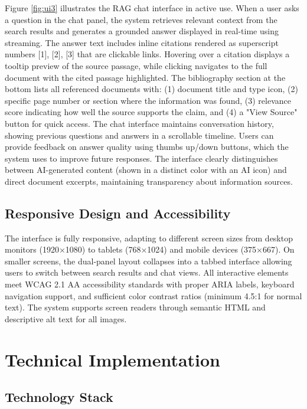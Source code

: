 Figure \ref{fig:ui3} illustrates the RAG chat interface in active use. When a user asks a question in the chat panel, the system retrieves relevant context from the search results and generates a grounded answer displayed in real-time using streaming. The answer text includes inline citations rendered as superscript numbers [1], [2], [3] that are clickable links. Hovering over a citation displays a tooltip preview of the source passage, while clicking navigates to the full document with the cited passage highlighted. The bibliography section at the bottom lists all referenced documents with: (1) document title and type icon, (2) specific page number or section where the information was found, (3) relevance score indicating how well the source supports the claim, and (4) a "View Source" button for quick access. The chat interface maintains conversation history, showing previous questions and answers in a scrollable timeline. Users can provide feedback on answer quality using thumbs up/down buttons, which the system uses to improve future responses. The interface clearly distinguishes between AI-generated content (shown in a distinct color with an AI icon) and direct document excerpts, maintaining transparency about information sources.

\subsection{Responsive Design and Accessibility}

The interface is fully responsive, adapting to different screen sizes from desktop monitors (1920×1080) to tablets (768×1024) and mobile devices (375×667). On smaller screens, the dual-panel layout collapses into a tabbed interface allowing users to switch between search results and chat views. All interactive elements meet WCAG 2.1 AA accessibility standards with proper ARIA labels, keyboard navigation support, and sufficient color contrast ratios (minimum 4.5:1 for normal text). The system supports screen readers through semantic HTML and descriptive alt text for all images.

\clearpage

\section{Technical Implementation}

\subsection{Technology Stack}

